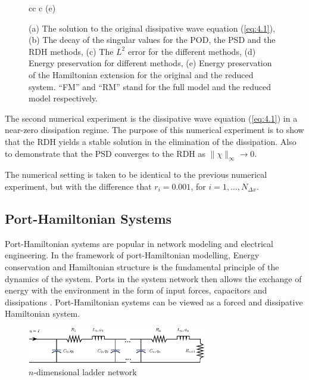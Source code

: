 \begin{figure}[t]
\begin{tabular}{cc}
 {c} {(e)} 
\end{tabular}
\caption{(a) The solution to the original dissipative wave equation (\ref{eq:4.1}), (b) The decay of the singular values for the POD, the PSD and the RDH methods, (c) The $L^2$ error for the different methods, (d) Energy preservation for different methods, (e) Energy preservation of the Hamiltonian extension for the original and the reduced system. ``FM'' and ``RM'' stand for the full model and the reduced model respectively.} \label{fig:4.1}
\end{figure}

The second numerical experiment is the dissipative wave equation (\ref{eq:4.1}) in a near-zero dissipation regime. The purpose of this numerical experiment is to show that the RDH yields a stable solution in the elimination of the dissipation. Also to demonstrate that the PSD converges to the RDH as $\| \chi \|_{\infty}\to 0$. 

The numerical setting is taken to be identical to the previous numerical experiment, but with the difference that $r_i = 0.001$, for $i=1,\dots,N_{\Delta x}$. 

\subsection{Port-Hamiltonian Systems}
Port-Hamiltonian systems are popular in network modeling and electrical engineering. In the framework of port-Hamiltonian modelling, Energy conservation and Hamiltonian structure is the fundamental principle of the dynamics of the system. Ports in the system network then allows the exchange of energy with the environment in the form of input forces, capacitors and dissipations \cite{vanderSchaft:2014:PST:2693645.2693646}. Port-Hamiltonian systems can be viewed as a forced and dissipative Hamiltonian system.
\begin{figure}[t]
\begin{center}
	\includegraphics[width=0.7\textwidth]{./figs/porthamil/circuit}
\end{center}
\caption{$n$-dimensional ladder network} \label{fig:4.2}
\end{figure}

